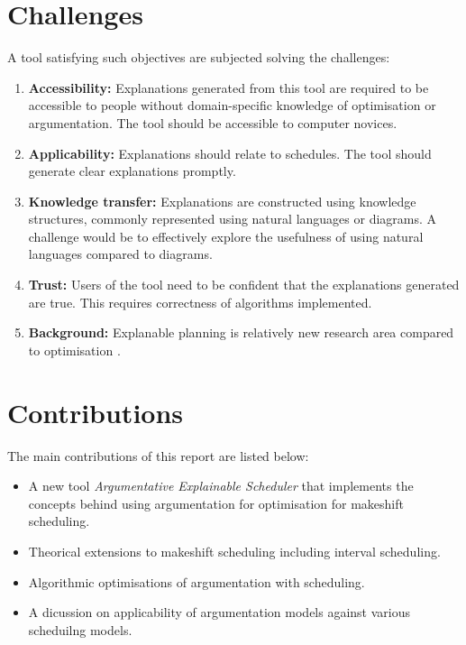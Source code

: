 \section{Challenges}

A tool satisfying such objectives are subjected solving the challenges:
\begin{enumerate}
	\item\textbf{Accessibility:} Explanations generated from this tool are required to be accessible to people without domain-specific knowledge of optimisation or argumentation. The tool should be accessible to computer novices.
	\item\textbf{Applicability:} Explanations should relate to schedules. The tool should generate clear explanations promptly.
	\item\textbf{Knowledge transfer:} Explanations are constructed using knowledge structures, commonly represented using natural languages or diagrams. A challenge would be to effectively explore the usefulness of using natural languages compared to diagrams.
	\item\textbf{Trust:} Users of the tool need to be confident that the explanations generated are true. This requires correctness of algorithms implemented.
	\item\textbf{Background:} Explanable planning is relatively new research area compared to optimisation \cite{pe}.
\end{enumerate}

\section{Contributions}

The main contributions of this report are listed below:
\begin{itemize}
	\item A new tool \emph{Argumentative Explainable Scheduler} that implements the concepts behind using argumentation for optimisation for makeshift scheduling.
	\item Theorical extensions to makeshift scheduling including interval scheduling.
	\item Algorithmic optimisations of argumentation with scheduling.
	\item A dicussion on applicability of argumentation models against various scheduilng models.
\end{itemize}
